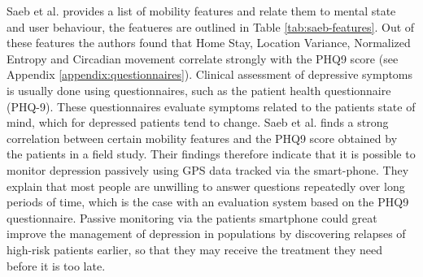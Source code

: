Saeb et al. provides a list of mobility features and relate them to mental state and user behaviour, the featueres are outlined in Table \ref{tab:saeb-features}. Out of these features the authors found that Home Stay, Location Variance, Normalized Entropy and Circadian movement correlate strongly with the PHQ9 score (see Appendix \ref{appendix:questionnaires}). Clinical assessment of depressive symptoms is usually done using questionnaires, such as the patient health questionnaire (PHQ-9). These questionnaires evaluate symptoms related to the patients state of mind, which for depressed patients tend to change. Saeb et al. finds a strong correlation between certain mobility features and the PHQ9 score obtained by the patients in a field study. Their findings therefore indicate that it is possible to monitor depression passively using GPS data tracked via the smart-phone. They explain that most people are unwilling to answer questions repeatedly over long periods of time, which is the case with an evaluation system based on the PHQ9 questionnaire. Passive monitoring via the patients smartphone could great improve the management of depression in populations by discovering relapses of high-risk patients earlier, so that they may receive the treatment they need before it is too late. \\



